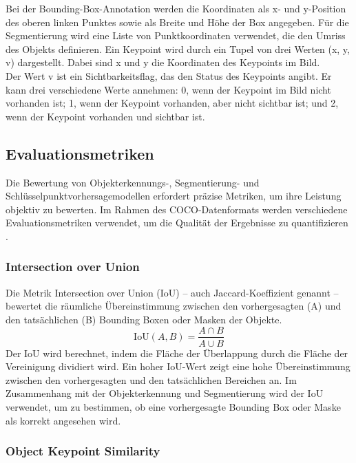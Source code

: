 Bei der Bounding-Box-Annotation werden die Koordinaten als x- und y-Position des oberen linken Punktes sowie als Breite und Höhe der Box angegeben. Für die Segmentierung wird eine Liste von Punktkoordinaten verwendet, die den Umriss des Objekts definieren. Ein Keypoint wird durch ein Tupel von drei Werten (x, y, v) dargestellt. Dabei sind x und y die Koordinaten des Keypoints im Bild.\\Der Wert v ist ein Sichtbarkeitsflag, das den Status des Keypoints angibt. Er kann drei verschiedene Werte annehmen: 0, wenn der Keypoint im Bild nicht vorhanden ist; 1, wenn der Keypoint vorhanden, aber nicht sichtbar ist; und 2, wenn der Keypoint vorhanden und sichtbar ist.



\subsection{Evaluationsmetriken}
Die Bewertung von Objekterkennungs-, Segmentierung- und Schlüsselpunktvorhersagemodellen erfordert präzise Metriken, um ihre Leistung objektiv zu bewerten. Im Rahmen des COCO-Datenformats werden verschiedene Evaluationsmetriken verwendet, um die Qualität der Ergebnisse zu quantifizieren \cite{coco}.
\subsubsection{Intersection over Union}

Die Metrik Intersection over Union (IoU) – auch Jaccard-Koeffizient genannt – bewertet die räumliche Übereinstimmung zwischen den vorhergesagten (A) und den tatsächlichen (B) Bounding Boxen oder Masken der Objekte.
\begin{equation}
    \text{IoU}(A, B) = \dfrac{{A \cap B}}{{A \cup B}}
\end{equation}
Der IoU wird berechnet, indem die Fläche der Überlappung durch die Fläche der Vereinigung dividiert wird. Ein hoher IoU-Wert zeigt eine hohe Übereinstimmung zwischen den vorhergesagten und den tatsächlichen Bereichen an. Im Zusammenhang mit der Objekterkennung und Segmentierung wird der IoU verwendet, um zu bestimmen, ob eine vorhergesagte Bounding Box oder Maske als korrekt angesehen wird.

\subsubsection{Object Keypoint Similarity}

